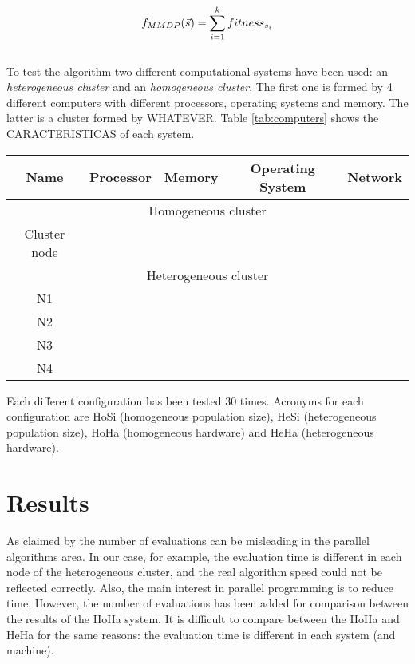 \documentclass{sig-alternate}
\begin{document}
\begin{equation}\label{eq:mmdp}
\scriptsize
f_{MMDP}(\vec s)= \sum_{i=1}^{k} fitness_{s_i}
\end{equation}\\



To test the algorithm two different computational systems have been used: an {\em heterogeneous cluster} and an {\em homogeneous cluster}. The first one is formed by 4 different computers with different processors, operating systems and memory. The latter is a cluster formed by WHATEVER. Table \ref{tab:computers} shows the CARACTERISTICAS of each system.

\begin{table*}
\centering
\caption{Details of the clusters used.}
\begin{tabular}{|c|c|c|c|c|} \hline
Name 		 & Processor 	& Memory 	& Operating System  & Network  \\ \hline
\multicolumn{5}{|c|}{Homogeneous cluster} \\ \hline
Cluster node &			    &			&					&		  	\\ \hline
\hline
\multicolumn{5}{|c|}{Heterogeneous cluster} \\ \hline
N1	&			    &			&					&		  	\\ \hline
N2 	&			    &			&					&		  	\\ \hline
N3 	&			    &			&					&		  	\\ \hline
N4 	&			    &			&					&		  	\\ \hline
\end{tabular}
\label{tab:computers}
\end{table*}

Each different configuration has been tested 30 times. Acronyms for each configuration are HoSi (homogeneous population size), HeSi (heterogeneous population size), HoHa (homogeneous hardware) and HeHa (heterogeneous hardware).

\section{Results}
\label{sec:results}

As claimed by \cite{PARALLELEVALUATION} the number of evaluations can be misleading in the parallel algorithms area. In our case, for example, the evaluation time is different in each node of the heterogeneous cluster, and the real algorithm speed could not be reflected correctly. Also, the main interest in parallel programming is to reduce time. However, the number of evaluations has been added for comparison between the results of the HoHa system. It is difficult to compare between the HoHa and HeHa for the same reasons: the evaluation time is different in each system (and machine).
\end{document}

